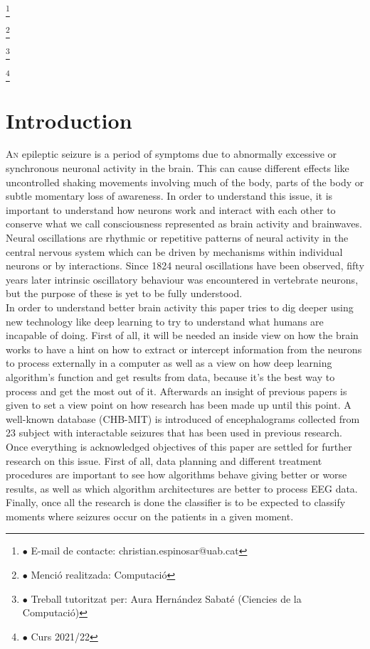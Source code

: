 ﻿\documentclass[10pt,a4paper,twocolumn,twoside]{article}
\newcommand\blfootnote[1]{%
  \begingroup
  \renewcommand\thefootnote{}\footnote{#1}%
  \addtocounter{footnote}{-1}%
  \endgroup
}
\begin{document}
\blfootnote{$\bullet$ E-mail de contacte: christian.espinosar@uab.cat}
\blfootnote{$\bullet$ Menció realitzada: Computació }
\blfootnote{$\bullet$ Treball tutoritzat per: Aura Hernández Sabaté (Ciencies de la Computació)}
\blfootnote{$\bullet$ Curs 2021/22}

\section{Introduction}

\lettrine[lines=3]{A}{n} epileptic seizure is a period of symptoms due to abnormally excessive or synchronous neuronal activity in the brain. This can cause different effects like uncontrolled shaking movements involving much of the body, parts of the body or subtle momentary loss of awareness. In order to understand this issue, it is important to understand how neurons work and interact with each other to conserve what we call consciousness represented as brain activity and brainwaves. 
\\
Neural oscillations are rhythmic or repetitive patterns of neural activity in the central nervous system which can be driven by mechanisms within individual neurons or by interactions. Since 1824 neural oscillations have been observed, fifty years later intrinsic oscillatory behaviour was encountered in vertebrate neurons, but the purpose of these is yet to be fully understood.
\\
In order to understand better brain activity this paper tries to dig deeper using new technology like deep learning to try to understand what humans are incapable of doing. First of all, it will be needed an inside view on how the brain works to have a hint on how to extract or intercept information from the neurons to process externally in a computer as well as a view on how deep learning algorithm’s function and get results from data, because it’s the best way to process and get the most out of it. Afterwards an insight of previous papers is given to set a view point on how research has been made up until this point. A well-known database (CHB-MIT) is introduced of encephalograms collected from 23 subject with interactable seizures that has been used in previous research.
\\
Once everything is acknowledged objectives of this paper are settled for further research on this issue. First of all, data planning and different treatment procedures are important to see how algorithms behave giving better or worse results, as well as which algorithm architectures are better to process EEG data. Finally, once all the research is done the classifier is to be expected to classify moments where seizures occur on the patients in a given moment.
\\
\end{document}
